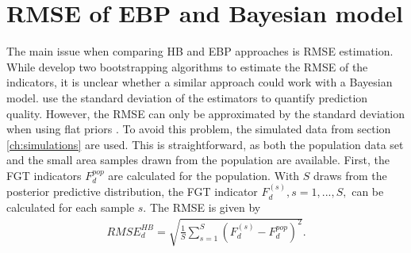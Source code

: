 \section{RMSE of EBP and Bayesian model}

The main issue when comparing HB and EBP approaches is RMSE estimation.
While \cite{rojas_perilla_data_2020} develop two bootstrapping algorithms to estimate the RMSE of the indicators, it is unclear whether a similar approach could work with a Bayesian model.
\cite{molina_small_2014} use the standard deviation of the estimators to quantify prediction quality.
However, the RMSE can only be approximated by the standard deviation when using flat priors \citep[Chapter 10.3.2]{rao_small_2015}.
To avoid this problem, the simulated data from section \ref{ch:simulations} are used.
This is straightforward, as both the population data set and the small area samples drawn from the population are available.
First, the FGT indicators $F_d^{pop}$ are calculated for the population. With $S$ draws from the posterior predictive distribution, the FGT indicator $F_d^{(s)}, s = 1, ..., S,$ can be calculated for each sample $s$.
The RMSE is given by
\begin{gather*}
    RMSE_d^{HB} = \displaystyle \sqrt{\frac 1 S \sum_{s = 1}^S (F_d^{(s)} - F_d^{pop})^2}.
\end{gather*}

